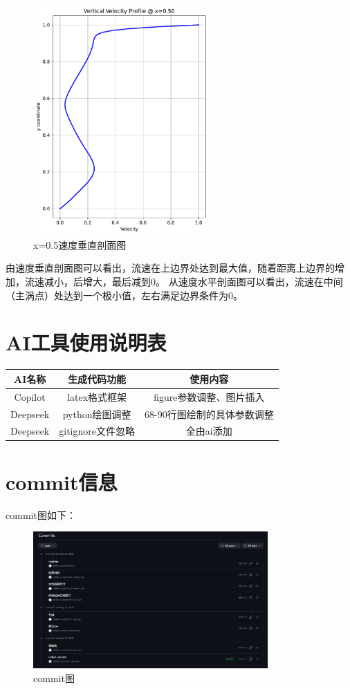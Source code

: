 \documentclass[12pt,a4paper]{article}
\begin{document}
\begin{figure}[H]
    \centering
    \includegraphics[width=0.6\textwidth]{3_vertical_profile.pdf}
    \caption{x=0.5速度垂直剖面图}
    \label{fig:velocity_profile}
\end{figure}
由速度垂直剖面图可以看出，流速在上边界处达到最大值，随着距离上边界的增加，流速减小，后增大，最后减到0。
从速度水平剖面图可以看出，流速在中间（主涡点）处达到一个极小值，左右满足边界条件为0。

\section{AI工具使用说明表}
\begin{table}[!htbp]
    \centering
    \begin{tabular}{|c|c|c|}
        \hline
        \textbf{AI名称} & \textbf{生成代码功能} & \textbf{使用内容} \\
        \hline
        Copilot & latex格式框架 & figure参数调整、图片插入\\
        \hline
        Deepseek & python绘图调整 & 68-90行图绘制的具体参数调整\\
        \hline
        Deepseek & gitignore文件忽略 & 全由ai添加\\
        \hline
\end{tabular}
\end{table}
\section{commit信息}
commit图如下：
\begin{figure}[H]
    \centering
    \includegraphics[width=0.8\textwidth]{commit.pdf}
    \caption{commit图}
    \label{fig:commit}
\end{figure}
\end{document}
